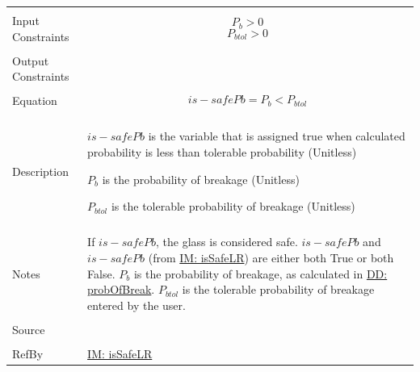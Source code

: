 \documentclass[12pt]{article}
\begin{document}
\begin{minipage}{\textwidth}
\begin{tabular}{>{\raggedright}p{}>{\raggedright\arraybackslash}p{}}
\\ \midrule \\
Input Constraints & \begin{displaymath}
                    {P_{b}}>0
                    \end{displaymath}
                    \begin{displaymath}
                    {P_{btol}}>0
                    \end{displaymath}
\\ \midrule \\
Output Constraints & 
\\ \midrule \\
Equation & \begin{displaymath}
           is-safePb={P_{b}}<{P_{btol}}
           \end{displaymath}
\\ \midrule \\
Description & \begin{symbDescription}
              \item{$is-safePb$ is the variable that is assigned true when calculated probability is less than tolerable probability (Unitless)}
              \item{${P_{b}}$ is the probability of breakage (Unitless)}
              \item{${P_{btol}}$ is the tolerable probability of breakage (Unitless)}
              \end{symbDescription}
\\ \midrule \\
Notes & If $is-safePb$, the glass is considered safe. $is-safePb$ and $is-safePb$ (from \hyperref[IM:isSafeLR]{IM: isSafeLR}) are either both True or both False. ${P_{b}}$ is the probability of breakage, as calculated in \hyperref[DD:probOfBreak]{DD: probOfBreak}. ${P_{btol}}$ is the tolerable probability of breakage entered by the user.
        
\\ \midrule \\
Source & \cite{astm2009}
         
\\ \midrule \\
RefBy & \hyperref[IM:isSafeLR]{IM: isSafeLR}
        
\\ \bottomrule
\end{tabular}
\end{minipage}
\end{document}

